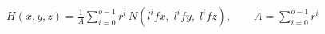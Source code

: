 \documentclass[border=6pt]{standalone}
\begin{document}
\color{black}
\(\displaystyle
H(x,y,z)=
\frac{1}{A}
\sum_{i=0}^{o-1}
r^i\,
N\!\left(l^i f x,\;l^i f y,\;l^i f z\right),
\qquad
A=\sum_{i=0}^{o-1} r^i
\)
\end{document}
